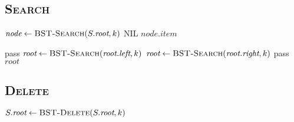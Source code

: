 \subsection{\textsc{Search}}

\begin{minipage}[t]{0.425\linewidth} \begin{algorithm}[H] \begin{algorithmic}[1]
        \State $\textit{node} \gets \textsc{BST-Search}(S.\textit{root}, k)$
            \State \Return $\text{NIL}$
        \EndIf
        \State \Return $\textit{node.item}$
    \EndProcedure
\end{algorithmic} \end{algorithm} \end{minipage}
\hfill
\begin{minipage}[t]{0.525\linewidth} \begin{algorithm}[H] \begin{algorithmic}[1]
        \State {}
            \State pass 
            \State $\textit{root} \gets \textsc{BST-Search}(\textit{root.left}, k)$
            \State $\textit{root} \gets \textsc{BST-Search}(\textit{root.right}, k)$
        \Else {~} 
            \State pass
        \EndIf
        \State \Return $\textit{root}$
    \EndProcedure
\end{algorithmic} \end{algorithm} \end{minipage}

\subsection{\textsc{Delete}}

\begin{algorithm}[H] \begin{algorithmic}[1]
        \State $S.\textit{root} \gets \textsc{BST-Delete}(S.\textit{root}, k)$
    \EndProcedure
\end{algorithmic} \end{algorithm}

